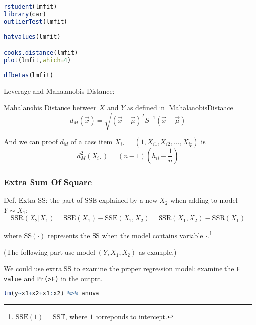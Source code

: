     
 


\begin{rcode}
\begin{lstlisting}[language=R]
rstudent(lmfit)
library(car)
outlierTest(lmfit)

hatvalues(lmfit)

cooks.distance(lmfit)
plot(lmfit,which=4)

dfbetas(lmfit)
\end{lstlisting}
\end{rcode}

















Leverage and Mahalanobis Distance:
    
Mahalanobis Distance between $ X $ and $ Y $ as defined in \autoref{MahalanobisDistance}
\begin{equation}
     d_M(\vec{x})=\sqrt{(\vec{x}-\vec{\mu})^TS ^{-1}(\vec{x}-\vec{\mu})} 
\end{equation}

And we can proof $ d_M $ of a case item $ X_{ i\cdot}=(1,X_{i1},X_{i2},\ldots,X_{ip}) $ is
\begin{equation}
    d_{M}^2(X_{i\cdot})=(n-1)(h_{ii}-\dfrac{1}{n}) 
\end{equation}


\subsubsection{Extra Sum Of Square}\label{SubSubSectionExtraSumOfSquare}
    Def. Extra SS: the part of SSE explained by a new $ X_2 $ when adding to model $ Y\sim X_1 $:
    \begin{equation}
        \mathrm{SSR}(X_2|X_1)=\mathrm{SSE}(X_1)-\mathrm{SSE}(X_1,X_2)=\mathrm{SSR}(X_1,X_2)-\mathrm{SSR}(X_1)  
    \end{equation}

    where $ \mathrm{SS}(\cdot)  $ represents the $ \mathrm{SS} $ when the model contains variable $ \cdot $.\footnote{$ \mathrm{SSE}(1)=\mathrm{SST} $, where $ 1 $ correponds to intercept.}
    
    
    (The following part use model $ (Y,X_1,X_2) $ as example.)


    We could use extra SS to examine the proper regression model: examine the \lstinline|F value| and \lstinline|Pr(>F)| in the output.
\begin{rcode}
\begin{lstlisting}[language=R]
lm(y~x1+x2+x1:x2) %>% anova
\end{lstlisting}
\end{rcode}

